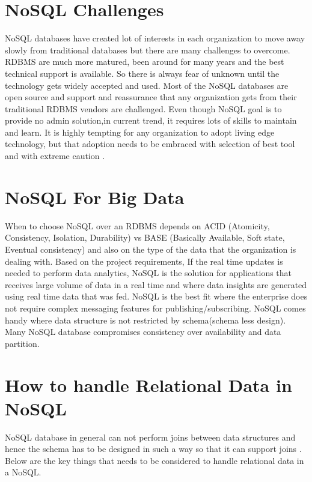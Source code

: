 \documentclass[sigconf]{acmart}
\begin{document}
\section{NoSQL Challenges}

NoSQL databases have created lot of interests in each organization to move away slowly from traditional databases but there are many challenges to overcome. RDBMS are much more matured, been around for many years and the best technical support is available. So there is always fear of unknown until the technology gets widely accepted and used. Most of the NoSQL databases are open source and support and reassurance that any organization gets from their traditional RDBMS vendors are challenged. Even though NoSQL goal is to provide no admin solution,in current trend, it requires lots of skills to maintain and learn. It is highly tempting for any organization to adopt living edge technology, but that adoption needs to be embraced with selection of best tool and with extreme caution \cite{dbkumar}.

\section{NoSQL For Big Data}

When to choose NoSQL over an RDBMS depends on ACID (Atomicity, Consistency, Isolation, Durability) vs BASE (Basically Available, Soft state, Eventual consistency) and also on the type of the data that the organization is dealing with. Based on the project requirements, If the real time updates is needed to perform data analytics, NoSQL is the solution for applications that receives large volume of data in a real time and where data insights are generated using real time data that was fed. NoSQL is the best fit where the enterprise does not require complex messaging features for publishing/subscribing. NoSQL comes handy where data structure is not restricted by schema(schema less design). Many NoSQL database compromises consistency over availability and data partition.

\section{How to handle Relational Data in NoSQL}

NoSQL database in general can not perform joins between data structures and hence the schema has to be designed in such a way so that it can support joins \cite{vish}. Below are the key things that needs to be considered to handle relational data in a NoSQL.
\end{document}
